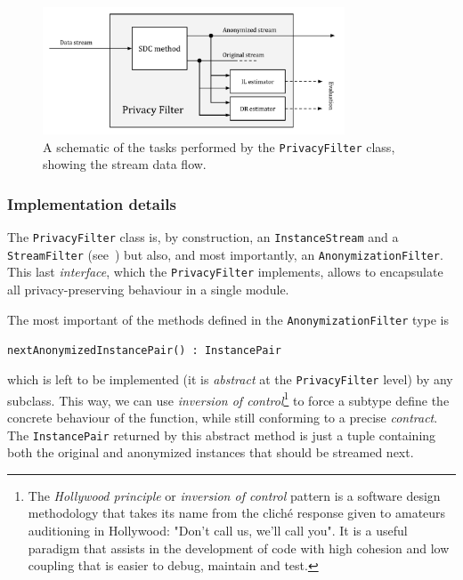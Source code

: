 \begin{figure}[h]
	\centering
	\includegraphics[width=0.8\textwidth]{figures/privacy-filter-schematic.pdf}
	\caption{A schematic of the tasks performed by the \texttt{PrivacyFilter} class, showing the stream data flow.}
	\label{fig:privacy-filter-schematic}
\end{figure}

\subsubsection*{Implementation details}
\label{Implementation:PrivacyFilter:PrivacyFilter:Details}

The \texttt{PrivacyFilter} class is, by construction, an \texttt{InstanceStream} and a \texttt{StreamFilter} (see~) but also, and most importantly, an \texttt{AnonymizationFilter}. This last \textit{interface}, which the \texttt{PrivacyFilter} implements, allows to encapsulate all privacy-preserving behaviour in a single module.

The most important of the methods defined in the \texttt{AnonymizationFilter} type is

\begin{center}
	\texttt{nextAnonymizedInstancePair() : InstancePair}
\end{center}

which is left to be implemented (it is \textit{abstract} at the \texttt{PrivacyFilter} level) by any subclass. This way, we can use \textit{inversion of control}\footnote{The \textit{Hollywood principle} or \textit{inversion of control} pattern is a software design methodology that takes its name from the cliché response given to amateurs auditioning in Hollywood: "Don't call us, we'll call you". It is a useful paradigm that assists in the development of code with high cohesion and low coupling that is easier to debug, maintain and test.} to force a subtype define the concrete behaviour of the function, while still conforming to a precise \textit{contract}. The \texttt{InstancePair} returned by this abstract method is just a tuple containing both the original and anonymized instances that should be streamed next.

